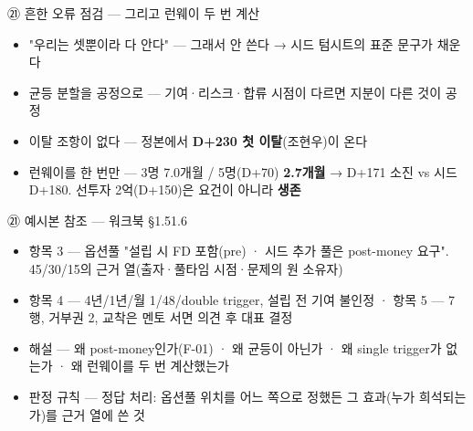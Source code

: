 \begin{frame}{㉑ 흔한 오류 점검 — 그리고 런웨이 두 번 계산}
\begin{itemize}
\item "우리는 셋뿐이라 다 안다" — 그래서 안 쓴다 → 시드 텀시트의 표준 문구가 채운다
\item 균등 분할을 공정으로 — 기여·리스크·합류 시점이 다르면 지분이 다른 것이 공정
\item 이탈 조항이 없다 — 정본에서 \textbf{D+230 첫 이탈}(조현우)이 온다
\item 런웨이를 한 번만 — 3명 7.0개월 / 5명(D+70\til{}) \textbf{2.7개월} → D+171 소진 vs 시드 D+180. 선투자 2억(D+150)은 요건이 아니라 \textbf{생존}
\end{itemize}
\end{frame}

\begin{frame}{㉑ 예시본 참조 — 워크북 §1.5\til{}1.6}
\begin{itemize}
\item 항목 3 — 옵션풀 "설립 시 FD 포함(pre) · 시드 추가 풀은 post-money 요구". 45/30/15의 근거 열(출자·풀타임 시점·문제의 원 소유자)
\item 항목 4 — 4년/1년/월 1/48/double trigger, 설립 전 기여 불인정 · 항목 5 — 7행, 거부권 2, 교착은 멘토 서면 의견 후 대표 결정
\item 해설 — 왜 post-money인가(F-01) · 왜 균등이 아닌가 · 왜 single trigger가 없는가 · 왜 런웨이를 두 번 계산했는가
\item 판정 규칙 — 정답 처리: 옵션풀 위치를 어느 쪽으로 정했든 그 효과(누가 희석되는가)를 근거 열에 쓴 것
\end{itemize}
\end{frame}

